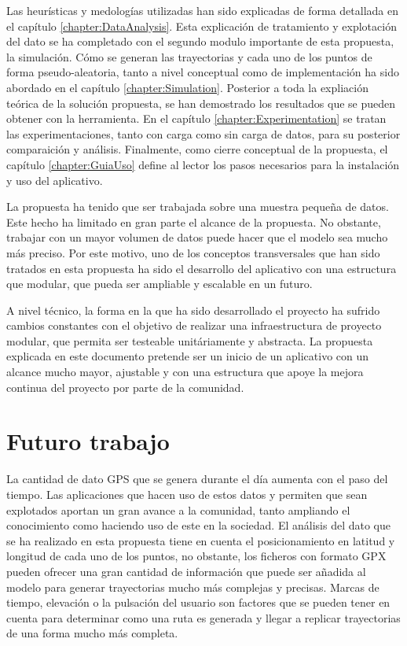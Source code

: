  Las heurísticas y medologías utilizadas han sido explicadas de forma detallada en el 
capítulo \ref{chapter:DataAnalysis}. Esta explicación de tratamiento y explotación del 
dato se ha completado con el segundo modulo importante de esta propuesta, la 
simulación. Cómo se generan las trayectorias y cada uno de los puntos de forma 
pseudo-aleatoria, tanto a nivel conceptual como de implementación ha sido abordado 
en el capítulo \ref{chapter:Simulation}. 
Posterior a toda la expliación teórica de la solución propuesta, se han demostrado los 
resultados que se pueden obtener con la herramienta. En el capítulo 
\ref{chapter:Experimentation} se tratan las experimentaciones, tanto con carga como 
sin carga de datos, para su posterior comparaición y análisis. Finalmente, como cierre 
conceptual de la propuesta, el capítulo \ref{chapter:GuiaUso} define al lector los pasos 
necesarios para la instalación y uso del aplicativo.

La propuesta ha tenido que ser trabajada sobre una muestra pequeña de datos. Este 
hecho ha limitado en gran parte el alcance de la propuesta. No obstante, trabajar con 
un mayor volumen de datos puede hacer que el modelo sea mucho más preciso. Por 
este motivo, uno de los conceptos transversales que han sido tratados en esta 
propuesta ha sido el desarrollo del aplicativo con una estructura que modular, que 
pueda ser ampliable y escalable en un futuro.

A nivel técnico, la forma en la que ha sido desarrollado el proyecto ha sufrido cambios 
constantes con el objetivo de realizar una infraestructura de proyecto modular, que 
permita ser testeable unitáriamente y abstracta. La propuesta explicada en este 
documento pretende ser un inicio de un aplicativo con un alcance mucho mayor, 
ajustable y con una estructura que apoye la mejora continua del proyecto por parte de 
la comunidad.

\section{Futuro trabajo}
La cantidad de dato \ac{GPS} que se genera durante el día aumenta con el paso del 
tiempo. Las aplicaciones que hacen uso de estos datos y permiten que sean explotados 
aportan un gran avance a la comunidad, tanto ampliando el conocimiento como 
haciendo uso de este en la sociedad. El análisis del dato que se ha realizado en esta 
propuesta tiene en cuenta el posicionamiento en latitud y longitud de cada uno de los 
puntos, no obstante, los ficheros con formato \ac{GPX} pueden ofrecer una gran 
cantidad de información que puede ser añadida al modelo para generar trayectorias 
mucho más complejas y precisas. Marcas de tiempo, elevación o la pulsación del 
usuario son factores que se pueden tener en cuenta para determinar como una ruta es 
generada y llegar a replicar trayectorias de una forma mucho más completa.

